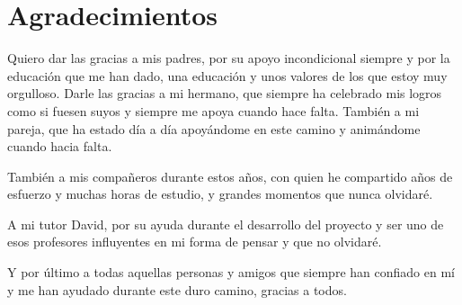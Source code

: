 
\chapter*{Agradecimientos}

Quiero dar las gracias a mis padres, por su apoyo incondicional siempre y por la educación que me han dado, una educación y unos valores de los que estoy muy orgulloso. Darle las gracias a mi hermano, que siempre ha celebrado mis logros como si fuesen suyos y siempre me apoya cuando hace falta. También a mi pareja, que ha estado día a día apoyándome en este camino y animándome cuando hacia falta.

También a mis compañeros durante estos años, con quien he compartido años de esfuerzo y muchas horas de estudio, y grandes momentos que nunca olvidaré.

A mi tutor David, por su ayuda durante el desarrollo del proyecto y ser uno de esos profesores influyentes en mi forma de pensar y que no olvidaré.

Y por último a todas aquellas personas y amigos que siempre han confiado en mí y me han ayudado durante este duro camino, gracias a todos.